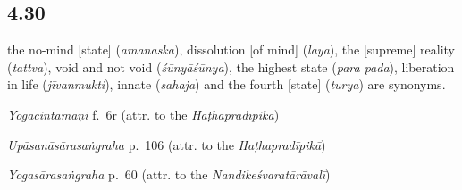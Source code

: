 \begin{ekdosis}

\subsection*{4.30}
\begin{translation}[hp04_030]
[\dots] the no-mind [state] (\emph{amanaska}), dissolution [of mind] (\emph{laya}), the [supreme] reality (\emph{tattva}), void and not void (\textit{śūnyāśūnya}), the highest state (\emph{para pada}), liberation in life (\emph{jīvanmukti}), innate (\emph{sahaja}) and the fourth [state] (\emph{turya}) are synonyms.
\end{translation}
% 

\begin{sources}[hp04_030]
\emph{Yogacintāmaṇi} f.~6r (attr. to the \emph{Haṭhapradīpikā})
\begin{versinnote}
\end{versinnote}

\emph{Upāsanāsārasaṅgraha} p.~106 (attr. to the \emph{Haṭhapradīpikā})
\begin{versinnote}
\end{versinnote}

\emph{Yogasārasaṅgraha} p.~60 (attr. to the \emph{Nandikeśvaratārāvalī})
\begin{versinnote}
\end{versinnote}
\end{sources}




\end{ekdosis}
